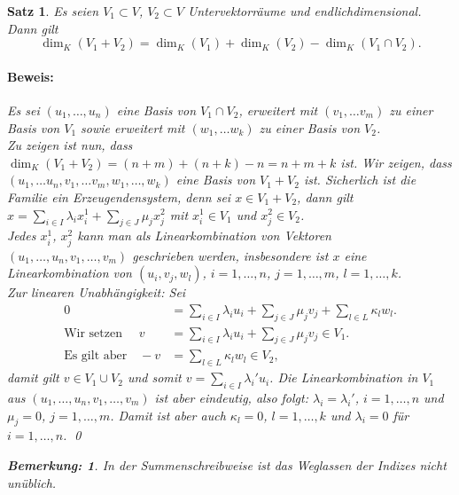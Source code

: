 \documentclass{report}
\newcommand{\lb}{\lambda}
\theoremstyle{customrem}
\newtheorem*{bemerkung}{Bemerkung\textnormal:}
\theoremstyle{customdef}
\newtheorem{satz}[definition]{Satz}
\renewenvironment{proof}{\paragraph{Beweis: }}{\qed}
\theoremstyle{customenv}
\begin{document}
	\begin{satz}
		Es seien \(V_1 \subset V\), \(V_2 \subset V\) Untervektorräume und endlichdimensional. Dann gilt \[\dim_K(V_1 + V_2) = \dim_K(V_1) + \dim_K(V_2) - \dim_K(V_1 \cap V_2).\]

		\begin{proof}
			Es sei \((u_1, \ldots, u_n)\) eine Basis von \(V_1\cap V_2\), erweitert mit \((v_1, \ldots v_m)\) zu einer Basis von \(V_1\) sowie erweitert mit \((w_1, \ldots w_k)\) zu einer Basis von \(V_2\). \\

			Zu zeigen ist nun, dass \(\dim_K(V_1 + V_2) = (n+m) + (n+k) -n = n+m+k\) ist. Wir zeigen, dass \((u_1, \ldots u_n, v_1, \ldots v_m,  w_1, \ldots, w_k)\) eine Basis von \(V_1 + V_2\) ist. Sicherlich ist die Familie ein Erzeugendensystem, denn sei \(x\in V_1 + V_2\), dann gilt \(x = \sum_{i\in I}\lb_i x_i^1 + \sum_{j\in J} \mu_j x_j^2\) mit \(x_i^1\in V_1\) und \(x_j^2\in V_2\).\\

			Jedes \(x_i^1\), \(x_j^2\) kann man als Linearkombination von Vektoren \((u_1,\ldots, u_n, v_1, \ldots, v_m)\) geschrieben werden, insbesondere ist \(x\) eine Linearkombination von \((u_i, v_j, w_l)\), \(i = 1,\ldots, n\), \(j=1, \ldots, m\), \(l = 1, \ldots, k\). \\

			Zur linearen Unabhängigkeit: Sei
			\begin{align*}
				0	&= \sum_{i\in I}\lb_i u_i + \sum_{j\in J} \mu_j v_j + \sum_{l\in L} \kappa_l w_l.\\\text{Wir setzen }\quad
				v	&= \sum_{i\in I} \lb_i u_i + \sum_{j \in J} \mu_j v_j\in V_1.\\\text{Es gilt aber}\quad
				-v 	&= \sum_{l\in L}\kappa_l w_l\in V_2,
			\end{align*}
			damit gilt \(v\in V_1 \cup V_2\) und somit \(v=\sum_{i\in I}\lb_i'u_i\). Die Linearkombination in \(V_1\) aus \((u_1, \ldots, u_n, v_1, \ldots, v_m)\) ist aber eindeutig, also folgt: \(\lb_i = \lb_i'\), \(i = 1, \ldots, n\) und \(\mu_j = 0\), \(j =1, \ldots, m\). Damit ist aber auch \(\kappa_l=0\), \(l=1, \ldots, k\) und \(\lb_i=0\) für \(i=1, \ldots, n\).
		\end{proof}
		\vspace{.2cm}
		\begin{bemerkung}
			In der Summenschreibweise ist das Weglassen der Indizes nicht unüblich.
		\end{bemerkung}
	\end{satz}
\end{document}
